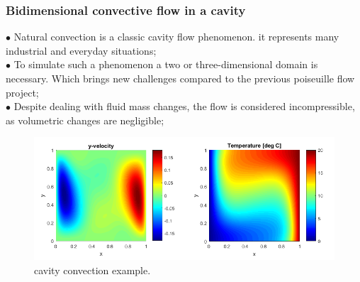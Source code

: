\documentclass[xcolor=dvipsnames,10pt,aspectratio=169]{beamer}
\begin{document}
\begin{frame}\frametitle{Bidimensional convective flow in a cavity}
	\begin{minipage}[h!]{0.39\textwidth}
		$\bullet$ Natural convection is a classic cavity flow phenomenon. it represents many industrial and everyday situations;\\
		$\bullet$ To simulate such a phenomenon a two or three-dimensional domain is necessary. Which brings new challenges compared to the previous poiseuille flow project;\\
		$\bullet$ Despite dealing with fluid mass changes, the flow is considered incompressible, as volumetric changes are negligible;\\

	\end{minipage}
	\begin{minipage}[h!]{0.6\textwidth}
		\begin{figure}[h!]
			\centering
			\includegraphics[trim = {0cm 0cm 0cm 0cm}, clip , angle=0, scale=0.45]{./my_images/NaturalConvectionFromNet.png}
			\caption{cavity convection example.}
		\end{figure}
	\end{minipage}
\end{frame}
\end{document}
